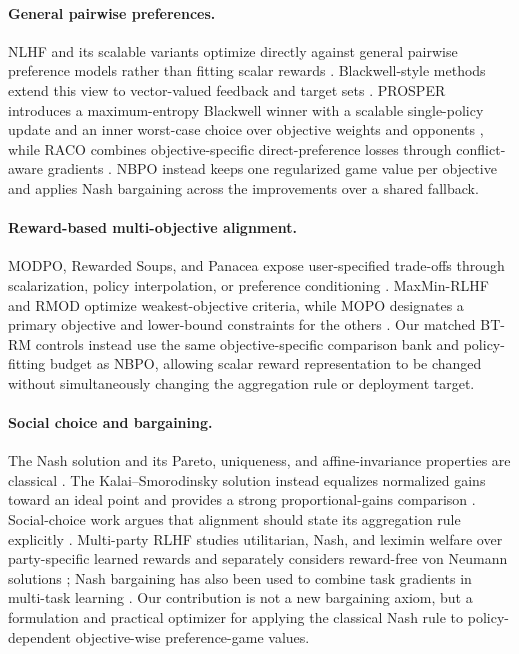 \documentclass{article}
\theoremstyle{remark}
\theoremstyle{plain}
\newcommand{\NBPO}{\textsc{NBPO}}
\begin{document}
\paragraph{General pairwise preferences.}
NLHF and its scalable variants optimize directly against general pairwise preference models rather than fitting scalar rewards \citep{munos2024nash,wu2025sppo,zhang2025iterative,calandriello2024online,rosset2024direct,zhou2025egpo}. Blackwell-style methods extend this view to vector-valued feedback and target sets \citep{blackwell1956analog,bhatia2020multicriteria}. PROSPER introduces a maximum-entropy Blackwell winner with a scalable single-policy update and an inner worst-case choice over objective weights and opponents \citep{zhang2026prosper}, while RACO combines objective-specific direct-preference losses through conflict-aware gradients \citep{chen2026raco}. \NBPO{} instead keeps one regularized game value per objective and applies Nash bargaining across the improvements over a shared fallback.

\paragraph{Reward-based multi-objective alignment.}
MODPO, Rewarded Soups, and Panacea expose user-specified trade-offs through scalarization, policy interpolation, or preference conditioning \citep{zhou2024beyond,rame2023rewarded,zhong2024panacea}. MaxMin-RLHF and RMOD optimize weakest-objective criteria, while MOPO designates a primary objective and lower-bound constraints for the others \citep{chakraborty2024maxmin,son2026rmod,agnihotri2026mopo}. Our matched BT-RM controls instead use the same objective-specific comparison bank and policy-fitting budget as \NBPO{}, allowing scalar reward representation to be changed without simultaneously changing the aggregation rule or deployment target.

\paragraph{Social choice and bargaining.}
The Nash solution and its Pareto, uniqueness, and affine-invariance properties are classical \citep{nash1950}. The Kalai--Smorodinsky solution instead equalizes normalized gains toward an ideal point and provides a strong proportional-gains comparison \citep{kalai1975}. Social-choice work argues that alignment should state its aggregation rule explicitly \citep{conitzer2024social}. Multi-party RLHF studies utilitarian, Nash, and leximin welfare over party-specific learned rewards and separately considers reward-free von Neumann solutions \citep{zhong2024nashwelfare}; Nash bargaining has also been used to combine task gradients in multi-task learning \citep{navon2022nashmtl}. Our contribution is not a new bargaining axiom, but a formulation and practical optimizer for applying the classical Nash rule to policy-dependent objective-wise preference-game values.
\end{document}
